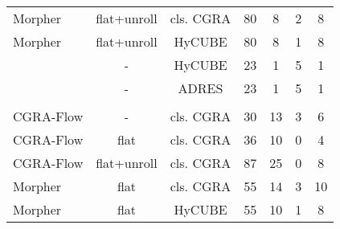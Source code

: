 \begin{table}
{\begin{tabular}{|l|c|c|c|c|c|c|}
 {Morpher}                                            & {flat+unroll}                        & cls. CGRA                            & 80                            & 8                          & 2                                   & 8 \\ 
 {Morpher}                                            & {flat+unroll}                        & HyCUBE                               & 80                            & 8                          & 1                                   & 8 \\
 \rowcolor{darkOrange!50}{CGRA-ME}                    & {-}                                  & HyCUBE                               & 23                            & 1                          & 5                                   & 1 \\
 \rowcolor{darkOrange!50}{Pillars}                    & {-}                                  & ADRES                                & 23                            & 1                          & 5                                   & 1 \\\hline\hline
 \rowcolor{darkGray} \multicolumn{7}{|c|}{\color{white}{\textbf{ATAX}}} \\\hline
 {CGRA-Flow}                                          & -                                    & cls. CGRA                            & 30                            & 13                         & 3                                   & 6 \\ 
 {CGRA-Flow}                                          & flat                                 & cls. CGRA                            & 36                            & 10                         & 0                                   & 4 \\
 {CGRA-Flow}                                          & flat+unroll                          & cls. CGRA                            & 87                            & 25                         & 0                                   & 8 \\ 
 {Morpher}                                            & {flat}                               & cls. CGRA                            & 55                            & 14                         & 3                                   & 10 \\
 {Morpher}                                            & {flat}                               & HyCUBE                               & 55                            & 10                         & 1                                   & 8 \\

\end{tabular}}
\end{table}
